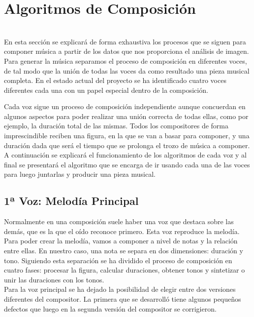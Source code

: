 \section{Algoritmos de Composición}
\label{sec:algComposicion}

\\

En esta sección se explicará de forma exhaustiva los procesos que se siguen para componer música a partir de los datos que nos proporciona el análisis de imagen.\\

Para generar la música separamos el proceso de composición en diferentes voces, de tal modo que la unión de todas las voces da como resultado una pieza musical completa. En el estado actual del proyecto se ha identificado cuatro voces diferentes cada una con un papel especial dentro de la composición. 

Cada voz sigue un proceso de composición independiente aunque concuerdan en algunos aspectos para poder realizar una unión correcta de todas ellas, como por ejemplo, la duración total de las mismas. Todos los compositores de forma imprescindible reciben una figura, en la que se van a basar para componer, y una duración dada que será el tiempo que se prolonga el trozo de música a componer.\\

A continuación se explicará el funcionamiento de los algoritmos de cada voz y al final se presentará el algoritmo que se encarga de ir usando cada una de las voces para luego juntarlas y producir una pieza musical.

\subsection{1ª Voz: Melodía Principal}

Normalmente en una composición suele haber una voz que destaca sobre las demás, que es la que el oído reconoce primero. Esta voz reproduce la melodía. Para poder crear la melodía, vamos a componer a nivel de notas y la relación entre ellas. En nuestro caso, una nota se separa en dos dimensiones: duración y tono. Siguiendo esta separación se ha dividido el proceso de composición en cuatro fases: procesar la figura, calcular duraciones, obtener tonos y sintetizar o unir las duraciones con los tonos.\\
Para la voz principal se ha dejado la posibilidad de elegir entre dos versiones diferentes del compositor. La primera que se desarrolló tiene algunos pequeños defectos que luego en la segunda versión del compositor se corrigieron.\\

